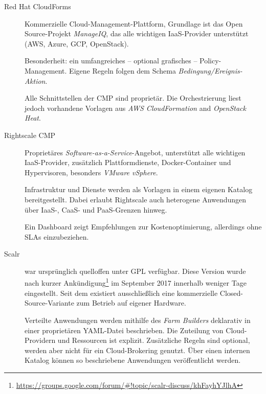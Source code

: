 \begin{description}
	
	\item[Red Hat CloudForms\footnotemark]
	Kommerzielle Cloud-Management-Plattform, Grundlage ist das Open Source-Projekt  \emph{ManageIQ}\footnotemark{}, das alle wichtigen IaaS-Provider unterstützt (AWS, Azure, GCP, OpenStack).
	
	Besonderheit: ein umfangreiches -- optional grafisches -- Policy-Management. Eigene Regeln folgen dem Schema \emph{Bedingung/Ereignis-Aktion}.
	
	Alle Schnittstellen der CMP sind proprietär. Die Orchestrierung liest jedoch vorhandene Vorlagen aus \emph{AWS CloudFormation} and \emph{OpenStack Heat}.
	
	\item[Rightscale CMP\footnotemark]
	Proprietäres \emph{Software-as-a-Service}-Angebot, unterstützt alle wichtigen IaaS-Provider, zusätzlich Plattformdienste, Docker-Container und Hypervisoren, besonders \emph{VMware vSphere}.
	
	Infrastruktur und Dienste werden als Vorlagen in einem eigenen Katalog bereitgestellt. Dabei erlaubt Rightscale auch heterogene Anwendungen über IaaS-, CaaS- und PaaS-Grenzen hinweg.
	
	Ein Dashboard zeigt Empfehlungen zur Kostenoptimierung, allerdings ohne SLAs einzubeziehen.
	
	\item[Scalr\footnotemark] war ursprünglich quelloffen unter GPL verfügbar. Diese Version wurde nach kurzer Ankündigung\footnote{\url{https://groups.google.com/forum/\#!topic/scalr-discuss/khFayhYJlhA}} im September 2017 innerhalb weniger Tage eingestellt. Seit dem existiert ausschließlich eine kommerzielle Closed-Source-Variante zum Betrieb auf eigener Hardware.	
	
	Verteilte Anwendungen werden mithilfe des \emph{Farm Builders} deklarativ in einer proprietären YAML-Datei beschrieben. Die Zuteilung von Cloud-Providern und Ressourcen ist explizit. Zusätzliche Regeln sind optional, werden aber nicht für ein Cloud-Brokering genutzt. Über einen internen Katalog können so beschriebene Anwendungen veröffentlicht werden.
	

\end{description}
